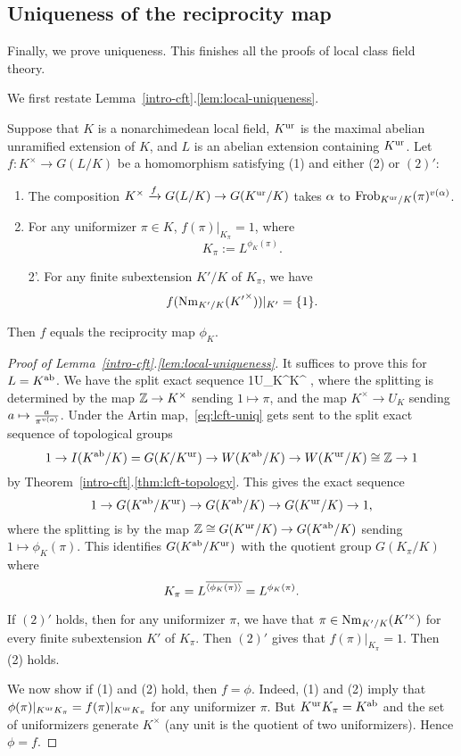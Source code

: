 \subsection{Uniqueness of the reciprocity map}
Finally, we prove uniqueness. This finishes all the proofs of local class field theory.

We first restate Lemma~\ref{intro-cft}.\ref{lem:local-uniqueness}.
%
\begin{lem*}
Suppose that $K$ is a nonarchimedean local field, $K^{\text{ur}}$ is the maximal abelian unramified extension of $K$, and $L$ is an abelian extension containing $K^{\text{ur}}$. Let $f:K^{\times}\to G(L/K)$ be a homomorphism satisfying (1) and either (2) or $(2)'$:
\begin{enumerate}
\item
The composition $K^{\times}\xrightarrow{f} G(L/K) \to G(K^{\text{ur}}/K)$ takes $\alpha$ to $\operatorname{Frob}_{K^{\text{ur}}/K}(\pi)^{v(\alpha)}$.
\item
For any uniformizer $\pi\in K$, $f(\pi)|_{K_{\pi}}=1$, where 
\[
K_{\pi}:=L^{\phi_K(\pi)}.
\]
\item[2'.]
For any finite subextension $K'/K$ of $K_{\pi}$, we have
\[
f(\operatorname{Nm}_{K'/K}({K'}^{\times}))|_{K'}=\{1\}.
\]
\end{enumerate}
Then $f$ equals the reciprocity map $\phi_K$.
\end{lem*}
%
\begin{proof}[Proof of Lemma~\ref{intro-cft}.\ref{lem:local-uniqueness}]
It suffices to prove this for $L=K^{\text{ab}}$. We have the split exact sequence
1\to U_K^{\times}\to K^{\times} \Z{},
\eeq
where the splitting is determined by the map $\mathbb{Z}\to K^{\times}$ sending $1\mapsto \pi$, and the map $K^{\times}\to U_K$ sending $a\mapsto \frac{a}{\pi^{v(a)}}$.
Under the Artin map,~\eqref{eq:lcft-uniq} gets sent to the split exact sequence of topological groups
\[
1\to I(K^{\text{ab}}/K)=G(K/K^{\text{ur}})\to W(K^{\text{ab}}/K)\to W(K^{\text{ur}}/K)\cong \mathbb{Z}\to 1
\]
by Theorem~\ref{intro-cft}.\ref{thm:lcft-topology}.
This gives the exact sequence
\[
1\to G(K^{\text{ab}}/K^{\text{ur}})\to G(K^{\text{ab}}/K)\to G(K^{\text{ur}}/K)\to 1,
\]
where the splitting is by the map $\mathbb{Z}\cong G(K^{\text{ur}}/K)\to G(K^{\text{ab}}/K)$ sending $1\mapsto \phi_K(\pi)$. This identifies $G(K^{\text{ab}}/K^{\text{ur}})$ with the quotient group $G(K_{\pi}/K)$ where 
\[K_{\pi}=L^{\overline{\left\langle {\phi_K(\pi)}\right\rangle}}=L^{\phi_K(\pi)}.\]

If $(2)'$ holds, then for any uniformizer $\pi$, we have that %
$\pi\in \operatorname{Nm}_{K'/K}(K'^{\times})$ for every finite subextension $K'$ of $K_{\pi}$. Then $(2)'$ gives that $f(\pi)|_{K_{\pi}}=1$. Then (2) holds.

We now show if (1) and (2) hold, then $f=\phi$. Indeed, (1) and (2) imply that $\phi(\pi)|_{K^{\text{ur}} K_{\pi}}=f(\pi)|_{K^{\text{ur}} K_{\pi}}$ for any uniformizer $\pi$. But $K^{\text{ur}} K_{\pi}=K^{\text{ab}}$ and the set of uniformizers generate $K^{\times}$ (any unit is the quotient of two uniformizers). Hence $\phi=f$.
\end{proof}
